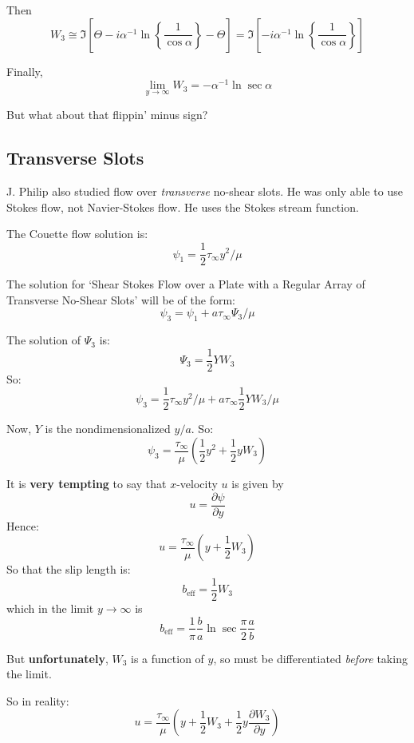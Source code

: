 \documentclass[a4paper]{report}
\begin{document}
Then
\[ W_{3} \cong \Im \left[  
 \Theta
 - i \alpha^{-1} \ln  \left\{ \frac{1}{ \cos \alpha} \right\}
     - \Theta  \right] = \Im \left[  
 - i \alpha^{-1} \ln  \left\{ \frac{1}{ \cos \alpha} \right\} \right] \]
     
Finally,
\[ \lim_{y \rightarrow \infty} W_{3} = - \alpha^{-1} \ln \sec \alpha \] 

\vspace{1em}
But what about that flippin' minus sign?

\pagebreak


\subsection*{Transverse Slots}

J. Philip also studied flow over \emph{transverse} no-shear slots.  He was only able to use Stokes flow, not Navier-Stokes flow.  He uses the Stokes stream function.

The Couette flow solution is:
\[ \psi_{1} = \frac{1}{2} \tau_{\infty} y^{2}/\mu \]

The solution for `Shear Stokes Flow over a Plate with a Regular Array of Transverse No-Shear Slots' will be of the form:
\[ \psi_{3} = \psi_{1} + a \tau_{\infty} \Psi_{3} /\mu\]

The solution of $\Psi_{3}$ is: \[ \Psi_{3} = \frac{1}{2} Y W_{3} \]
So: 
\[ \psi_{3} = \frac{1}{2} \tau_{\infty} y^{2}/\mu
            + a \tau_{\infty} \frac{1}{2} Y W_{3} /\mu  \]            

Now, $Y$ is the nondimensionalized $y/a$. So:
\[ \psi_{3} = \frac{\tau_{\infty}}{\mu} \left( \frac{1}{2} y^{2}
            + \frac{1}{2} y W_{3} \right)  \]      

It is \textbf{very tempting} to say that $x$-velocity $u$ is given by
\[ u = \frac{\partial \psi}{\partial y} \]
Hence:
\[ u = \frac{\tau_{\infty}}{\mu} \left( y
            + \frac{1}{2} W_{3} \right)  \]
So that the slip length is:
\[ b_{\mathrm{eff}} = \frac{1}{2} W_{3}\]
which in the limit $y \rightarrow \infty$ is 
\[ b_{\mathrm{eff}} = \frac{1}{\pi} \frac{b}{a} \ln \sec \frac{\pi}{2} \frac{a}{b} \]

But \textbf{unfortunately}, $W_{3}$ is a function of $y$, so must be differentiated \emph{before} taking the limit.

So in reality:
\[ u = \frac{\tau_{\infty}}{\mu} \left( y
            + \frac{1}{2} W_{3}
            + \frac{1}{2} y \frac{\partial W_{3}}{\partial y} \right) \]
\end{document}
